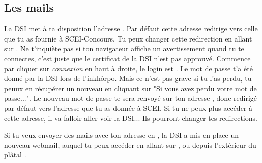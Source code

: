 
\subsection{Les mails}

La DSI met à ta disposition l'adresse .
Par défaut cette adresse redirige vers celle que tu as fournie à SCEI-Concours.
Tu peux changer cette redirection en allant sur .
Ne t'inquiète pas si ton navigateur affiche un avertissement quand tu te connectes, c'est juste que le certificat de la DSI n'est pas approuvé.
Commence par cliquer sur \emph{connexion} en haut à droite, le login est .
Le mot de passe t'a été donné par la DSI lors de l'inkhôrpo.
Mais ce n'est pas grave si tu l'as perdu, tu peuux en récupérer un nouveau en cliquant sur "Si vous avez perdu votre mot de passe...".
Le nouveau mot de passe te sera renvoyé sur ton adresse , donc redirigé par défaut vers l'adresse que tu as donnée à SCEI.
Si tu ne peux plus accéder à cette adresse, il va falloir aller voir la DSI... Ils pourront changer tes redirections.

Si tu veux envoyer des mails avec ton adresse en , la DSI a mis en place un nouveau webmail, auquel tu peux accéder en allant sur , ou depuis l'extérieur du plâtal .

